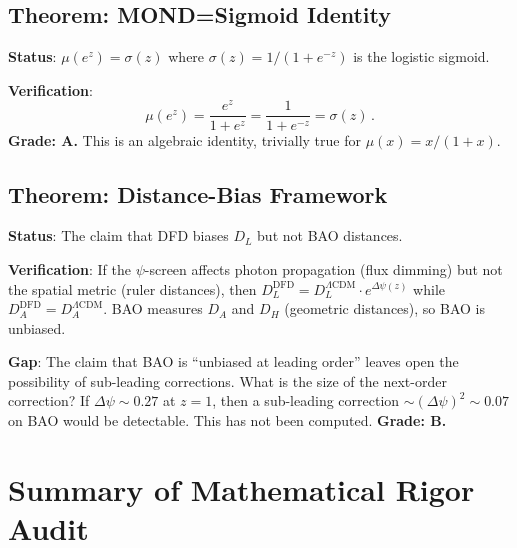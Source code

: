 \documentclass[11pt,a4paper]{article}
\begin{document}
\subsection{Theorem: MOND=Sigmoid Identity}

\textbf{Status}: $\mu(e^z) = \sigma(z)$ where $\sigma(z) = 1/(1+e^{-z})$ is the logistic sigmoid.

\textbf{Verification}:
\begin{equation}
\mu(e^z) = \frac{e^z}{1+e^z} = \frac{1}{1+e^{-z}} = \sigma(z)\,.
\end{equation}
\textbf{Grade: A.} This is an algebraic identity, trivially true for $\mu(x) = x/(1+x)$.

\subsection{Theorem: Distance-Bias Framework}

\textbf{Status}: The claim that DFD biases $D_L$ but not BAO distances.

\textbf{Verification}: If the $\psi$-screen affects photon propagation (flux dimming) but not the spatial metric (ruler distances), then $D_L^{\mathrm{DFD}} = D_L^{\Lambda\mathrm{CDM}} \cdot e^{\Delta\psi(z)}$ while $D_A^{\mathrm{DFD}} = D_A^{\Lambda\mathrm{CDM}}$. BAO measures $D_A$ and $D_H$ (geometric distances), so BAO is unbiased.

\textbf{Gap}: The claim that BAO is ``unbiased at leading order'' leaves open the possibility of sub-leading corrections. What is the size of the next-order correction? If $\Delta\psi \sim 0.27$ at $z = 1$, then a sub-leading correction $\sim (\Delta\psi)^2 \sim 0.07$ on BAO would be detectable. This has not been computed. \textbf{Grade: B.}

\section{Summary of Mathematical Rigor Audit}
\end{document}
